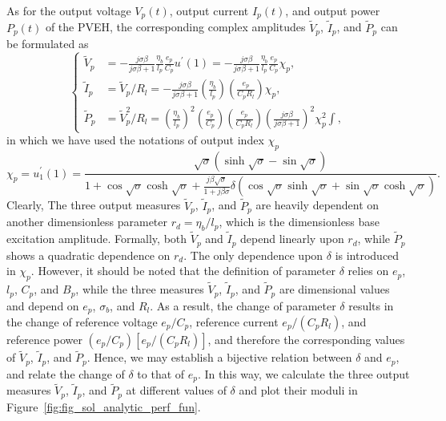 \documentclass{article}
\begin{document}
As for the output voltage $V_p(t)$, output current $I_p(t)$, and output power $P_p(t)$ of the PVEH, the corresponding complex amplitudes $\tilde{V}_p$, $\tilde{I}_p$, and $\tilde{P}_p$ can be formulated as
\begin{equation}
    \left\{\begin{aligned}
        \tilde{V}_p &= -\frac{j \sigma \beta}{j \sigma \beta + 1} \frac{\eta_b}{l_p} \frac{e_p}{C_p} u^\prime(1) = -\frac{j \sigma \beta}{j \sigma \beta + 1} \frac{\eta_b}{l_p} \frac{e_p}{C_p} \chi_p, \\
        \tilde{I}_p &=  \tilde{V}_p / R_l = - \frac{ j \sigma \beta } {j \sigma \beta + 1} \left( \frac{\eta_b}{l_p} \right) \left( \frac{e_p}{C_p R_l} \right) \chi_p , \\
        \tilde{P}_p &=  \tilde{V}_p^2 / R_l = \left(\frac{\eta_b}{l_p}\right)^2 \left(\frac{e_p}{C_p}\right) \left( \frac{e_p}{C_p R_l} \right) \left( \frac{ j \sigma \beta}{ j \sigma \beta + 1 } \right)^2 \chi_p^2∫,
    \end{aligned}\right.
    \label{eq:eq_peh_perfs_compact_form}
\end{equation}
in which we have used the notations of output index $\chi_p$ 
\begin{equation}
    \chi_p = u_1^\prime(1) = \frac{ \sqrt{\sigma} \left( \sinh\sqrt{\sigma} - \sin\sqrt{\sigma} \right) }{ 1 + \cos\sqrt{\sigma } \cosh\sqrt{\sigma } + \frac{j \beta \sqrt{\sigma}}{ 1+ j \beta \sigma } \delta \left( \cos\sqrt{\sigma } \sinh\sqrt{\sigma } + \sin\sqrt{\sigma } \cosh\sqrt{\sigma } \right) }.
    \label{eq:eq_peh_perfs_compact_form_end_ders}
\end{equation}
Clearly, The three output measures $\tilde{V}_p$, $\tilde{I}_p$, and $\tilde{P}_p$ are heavily dependent on another dimensionless parameter $r_d = \eta_b/l_p$, which is the dimensionless base excitation amplitude. Formally, both $\tilde{V}_p$ and $\tilde{I}_p$ depend linearly upon $r_d$, while $\tilde{P}_p$ shows a quadratic dependence on $r_d$. The only dependence upon $\delta$ is introduced in $\chi_p$. However, it should be noted that the definition of parameter $\delta$ relies on $e_p$, $l_p$, $C_p$, and $B_p$, while the three measures $\tilde{V}_p$, $\tilde{I}_p$, and $\tilde{P}_p$ are dimensional values and depend on $e_p$, $\sigma_b$, and $R_l$. As a result, the change of parameter $\delta$ results in the change of reference voltage $e_p / C_p$, reference current $e_p / (C_p R_l)$, and reference power $(e_p / C_p)[e_p / (C_p R_l)]$, and therefore the corresponding values of $\tilde{V}_p$, $\tilde{I}_p$, and $\tilde{P}_p$. Hence, we may establish a bijective relation between $\delta$ and $e_p$, and relate the change of $\delta$ to that of $e_p$. In this way, we calculate the three output measures $\tilde{V}_p$, $\tilde{I}_p$, and $\tilde{P}_p$ at different values of $\delta$ and plot their moduli in Figure~\ref{fig:fig_sol_analytic_perf_fun}.
\end{document}
